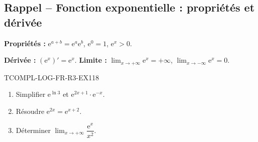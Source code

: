 

\subsection*{Rappel -- Fonction exponentielle : propriétés et dérivée}

\textbf{Propriétés :} $\mathrm{e}^{a+b} = \mathrm{e}^a \mathrm{e}^b$, $\mathrm{e}^0 = 1$, $\mathrm{e}^x > 0$.

\textbf{Dérivée :} $(\mathrm{e}^x)' = \mathrm{e}^x$. \textbf{Limite :} $\lim_{x \to +\infty} \mathrm{e}^x = +\infty$, $\lim_{x \to -\infty} \mathrm{e}^x = 0$.

\begin{exercice}{TCOMPL-LOG-FR-R3-EX1}{1}{8}
\begin{enumerate}
  \item Simplifier $\mathrm{e}^{\ln 3}$ et $\mathrm{e}^{2x + 1} \cdot \mathrm{e}^{-x}$.
  \item Résoudre $\mathrm{e}^{2x} = \mathrm{e}^{x+2}$.
  \item Déterminer $\lim_{x \to +\infty} \dfrac{\mathrm{e}^x}{x^2}$.
\end{enumerate}
\end{exercice}

